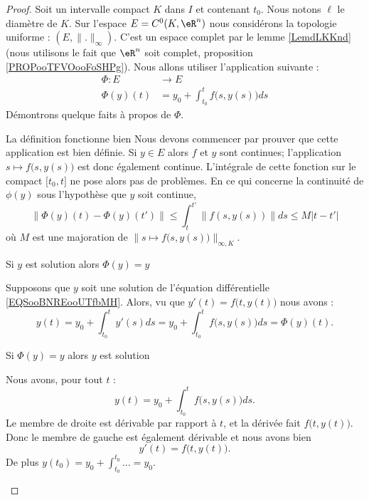 \begin{proof}
    Soit un intervalle compact \( K\) dans \( I\) et contenant \( t_0\). Nous notons \( \ell\) le diamètre de \( K\). Sur l'espace \( E=C^0(K,\eR^n)\) nous considérons la topologie uniforme : \( (E,\| . \|_{\infty})\). C'est un espace complet par le lemme \ref{LemdLKKnd} (nous utilisons le fait que \( \eR^n\) soit complet, proposition \ref{PROPooTFVOooFoSHPg}). Nous allons utiliser l'application suivante :
    \begin{equation}        \label{EQooJUTBooILBKoE}
        \begin{aligned}
            \Phi\colon E&\to E \\
            \Phi(y)(t)&=y_0+\int_{t_0}^tf\big( s,y(s) \big)ds
        \end{aligned}
    \end{equation}
    Démontrons quelque faits à propos de \( \Phi\).
    \begin{subproof}
        \item[La définition fonctionne bien]
            Nous devons commencer par prouver que cette application est bien définie. Si \( y\in E\) alors \( f\) et \( y\) sont continues; l'application \( s\mapsto f\big(s,y(s)\big)\) est donc également continue. L'intégrale de cette fonction sur le compact \( \mathopen[ t_0 , t \mathclose]\) ne pose alors pas de problèmes. En ce qui concerne la continuité de \( \phi(y)\) sous l'hypothèse que \( y\) soit continue,
    \begin{equation}
        \| \Phi(y)(t)-\Phi(y)(t') \|\leq \int_t^{t'}\| f(s,y(s)) \|ds\leq M| t-t' |
    \end{equation}
    où \( M\) est une majoration de \( \| s\mapsto f\big( s,y(s) \big) \|_{\infty,K}\).

        \item[Si \( y\) est solution alors \( \Phi(y)=y\)]

            Supposons que \( y\) soit une solution de l'équation différentielle \eqref{EQSooBNREooUTfbMH}. Alors, vu que \( y'(t)=f\big( t,y(t) \big)\) nous avons :
            \begin{equation}
                y(t)=y_0+\int_{t_0}^ty'(s)ds=y_0+\int_{t_0}^tf\big( s,y(s) \big)ds=\Phi(y)(t).
            \end{equation}
            
        \item[Si \( \Phi(y)=y\) alors \( y\) est solution]

            Nous avons, pour tout \( t\) :
            \begin{equation}
                y(t)=y_0+\int_{t_0}^tf\big( s,y(s) \big)ds.
            \end{equation}
            Le membre de droite est dérivable par rapport à \( t\), et la dérivée fait \(  f\big( t,y(t) \big)   \). Donc le membre de gauche est également dérivable et nous avons bien
            \begin{equation}
                y'(t)=f\big( t,y(t) \big).
            \end{equation}
            De plus \( y(t_0)=y_0+\int_{t_0}^{t_0}\ldots=y_0\).
    \end{subproof}
    

\end{proof}
